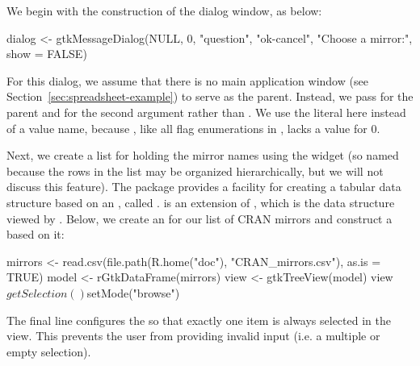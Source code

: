 \documentclass[article,shortnames]{jss}
\begin{document}
We begin with the construction of the dialog window, as below:
\begin{Code}
dialog <- gtkMessageDialog(NULL, 0, "question", "ok-cancel", 
                            "Choose a mirror:", show = FALSE)
\end{Code}
For this dialog,
we assume that there is no main application window (see Section~\ref{sec:spreadsheet-example}) to serve as the
parent. 
Instead, we pass  for the parent and  
for the second argument rather than . We
use the literal  here instead of a value name, because
, like all flag enumerations in , lacks
a value for $0$.

Next, we create a list for holding the mirror names using the
widget (so named because the rows in the list may be organized
hierarchically, but we will not discuss this feature). 
The  package provides a facility for creating a tabular
data structure based on an  ,
called .  is an extension of
, which is the data structure viewed by
. Below, we create an  for our
list of CRAN mirrors and construct a  based on it:
\begin{Code}
mirrors <- read.csv(file.path(R.home("doc"), "CRAN_mirrors.csv"),
                     as.is = TRUE)
model <- rGtkDataFrame(mirrors)
view <- gtkTreeView(model)
view$getSelection()$setMode("browse")
\end{Code}
The final line configures the  so that exactly one
item is always selected in the view. This prevents the user from
providing invalid input (i.e. a multiple or empty selection). 
\end{document}
